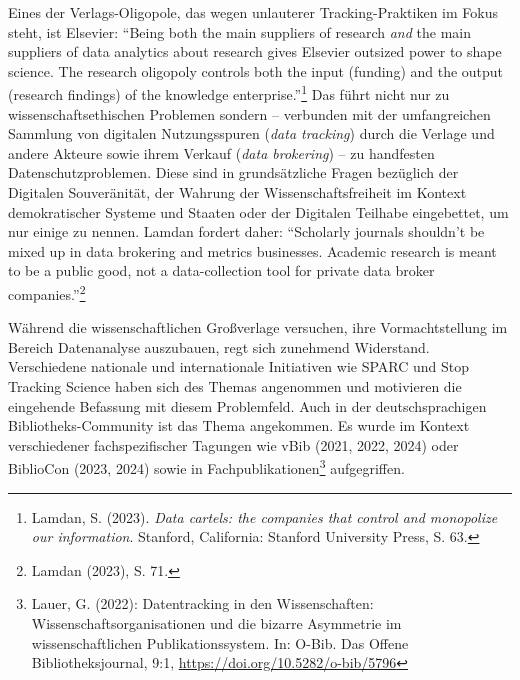 \documentclass[a4paper,
fontsize=11pt,
oneside,
numbers=noperiodatend,
parskip=half-,
bibliography=totoc,
final
]{scrartcl}
\begin{document}
Eines der Verlags-Oligopole, das wegen unlauterer Tracking-Praktiken im
Fokus steht, ist Elsevier: \enquote{Being both the main suppliers of
research \emph{and} the main suppliers of data analytics about research
gives Elsevier outsized power to shape science. The research oligopoly
controls both the input (funding) and the output (research findings) of
the knowledge enterprise.}\footnote{Lamdan, S. (2023). \emph{Data
  cartels: the companies that control and monopolize our information}.
  Stanford, California: Stanford University Press, S. 63.} Das führt
nicht nur zu wissenschaftsethischen Problemen sondern -- verbunden mit
der umfangreichen Sammlung von digitalen Nutzungsspuren (\emph{data
tracking}) durch die Verlage und andere Akteure sowie ihrem Verkauf
(\emph{data brokering}) -- zu handfesten Datenschutzproblemen. Diese
sind in grundsätzliche Fragen bezüglich der Digitalen Souveränität, der
Wahrung der Wissenschaftsfreiheit im Kontext demokratischer Systeme und
Staaten oder der Digitalen Teilhabe eingebettet, um nur einige zu
nennen. Lamdan fordert daher: \enquote{Scholarly journals shouldn't be
mixed up in data brokering and metrics businesses. Academic research is
meant to be a public good, not a data-collection tool for private data
broker companies.}\footnote{Lamdan (2023), S. 71.}

Während die wissenschaftlichen Großverlage versuchen, ihre
Vormachtstellung im Bereich Datenanalyse auszubauen, regt sich zunehmend
Widerstand. Verschiedene nationale und internationale Initiativen wie
SPARC und Stop Tracking Science haben sich des Themas angenommen und
motivieren die eingehende Befassung mit diesem Problemfeld. Auch in der
deutschsprachigen Bibliotheks-Community ist das Thema angekommen. Es
wurde im Kontext verschiedener fachspezifischer Tagungen wie vBib (2021,
2022, 2024) oder BiblioCon (2023, 2024) sowie in
Fachpublikationen\footnote{Lauer, G. (2022): Datentracking in den
  Wissenschaften: Wissenschaftsorganisationen und die bizarre Asymmetrie
  im wissenschaftlichen Publikationssystem. In: O-Bib. Das Offene
  Bibliotheksjournal, 9:1, \url{https://doi.org/10.5282/o-bib/5796}}
aufgegriffen.
\end{document}
